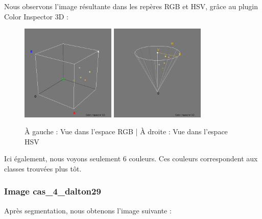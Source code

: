 \documentclass[a4paper]{article}
\begin{document}
Nous observons l'image résultante dans les repères RGB et HSV, grâce au plugin Color Inspector 3D :

\begin{figure}[H]
\begin{center}
  \includegraphics[width=170px]{../resultats/cas_4_dalton8_rgb.png}
\includegraphics[width=170px]{../resultats/cas_4_dalton8_hsv.png}
\end{center}
\caption{À gauche : Vue dans l'espace RGB | À droite : Vue dans l'espace HSV}
\end{figure}

Ici également, nous voyons seulement 6 couleurs. Ces couleurs correspondent aux classes trouvées plus tôt.

\clearpage
\subsubsection{Image cas\_4\_dalton29}

Après segmentation, nous obtenons l'image suivante :
\end{document}
